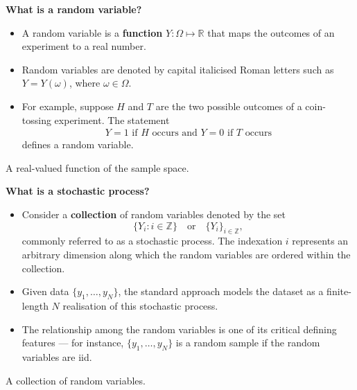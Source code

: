 \documentclass[
  letterpaper,
  DIV=11,
  numbers=noendperiod]{scrartcl}
\newcommand{\slidelabel}[1]{{\color{embernavy}\bfseries\large #1\par\vspace{5pt}}}
\newenvironment{slidefooter}{%
  \par\vspace{7pt}{\color{emberrule}\rule{\linewidth}{0.4pt}}\par\vspace{4pt}%
  \color{emberamber}\itshape\small}{\par}
\begin{document}
\begin{slidebox}

\slidelabel{What is a random variable?}

\begin{itemize}
\item
  A random variable is a \textbf{function}
  \(Y : \Omega \mapsto \mathbb{R}\) that maps the outcomes of an
  experiment to a real number.
\item
  Random variables are denoted by capital italicised Roman letters such
  as \(Y = Y(\omega)\), where \(\omega \in \Omega\).
\item
  For example, suppose \(H\) and \(T\) are the two possible outcomes of
  a coin-tossing experiment. The statement
  \[\begin{aligned} Y = 1 \text{ if }H\text{ occurs and }Y = 0\text{ if }T\text{ occurs} \end{aligned}\]
  defines a random variable.
\end{itemize}

\begin{slidefooter}

A real-valued function of the sample space.

\end{slidefooter}

\end{slidebox}

\begin{slidebox}

\slidelabel{What is a stochastic process?}

\begin{itemize}
\item
  Consider a \textbf{collection} of random variables denoted by the set
  \[\{Y_i : i \in \mathbb{Z}\} \quad \text{or} \quad \{Y_i\}_{i \in \mathbb{Z}},\]
  commonly referred to as a stochastic process. The indexation \(i\)
  represents an arbitrary dimension along which the random variables are
  ordered within the collection.
\item
  Given data \(\{y_1, \ldots, y_N\}\), the standard approach models the
  dataset as a finite-length \(N\) realisation of this stochastic
  process.
\item
  The relationship among the random variables is one of its critical
  defining features --- for instance, \(\{y_1, \ldots, y_N\}\) is a
  random sample if the random variables are iid.
\end{itemize}

\begin{slidefooter}

A collection of random variables.

\end{slidefooter}

\end{slidebox}
\end{document}

